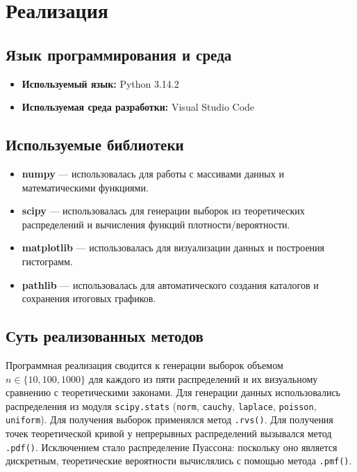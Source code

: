 \documentclass[a4paper, 14pt]{extarticle}
\begin{document}
\section{Реализация}

\subsection{Язык программирования и среда}
    \begin{itemize}
        \item \textbf{Используемый язык:} Python 3.14.2
        \item \textbf{Используемая среда разработки:} Visual Studio Code
    \end{itemize}

\subsection{Используемые библиотеки}
    \begin{itemize}
        \item \textbf{numpy} --- использовалась для работы с массивами данных и математическими функциями.
        \item \textbf{scipy} --- использовалась для генерации выборок из теоретических распределений и вычисления функций плотности/вероятности.
        \item \textbf{matplotlib} --- использовалась для визуализации данных и построения гистограмм.
        \item \textbf{pathlib} --- использовалась для автоматического создания каталогов и сохранения итоговых графиков.
    \end{itemize}

\subsection{Суть реализованных методов}
Программная реализация сводится к генерации выборок объемом $n \in \{10, 100, 1000\}$ для каждого из пяти распределений и их визуальному сравнению с теоретическими законами. Для генерации данных использовались распределения из модуля \texttt{scipy.stats} (\texttt{norm}, \texttt{cauchy}, \texttt{laplace}, \texttt{poisson}, \texttt{uniform}). Для получения выборок применялся метод \texttt{.rvs()}.
Для получения точек теоретической кривой у непрерывных распределений вызывался метод \texttt{.pdf()}. Исключением стало распределение Пуассона: поскольку оно является дискретным, теоретические вероятности вычислялись с помощью метода \texttt{.pmf()}.
\end{document}
